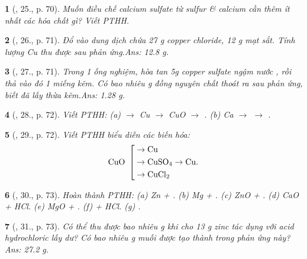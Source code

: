 \documentclass{article}
\newtheorem{baitoan}{}
\begin{document}
\begin{baitoan}[\cite{An_Hoa_Hoc_nang_cao_8_9}, 25., p. 70]
	Muốn điều chế calcium sulfate từ sulfur \& calcium cần thêm ít nhất các hóa chất gì? Viết {\rm PTHH}.
\end{baitoan}

\begin{baitoan}[\cite{An_Hoa_Hoc_nang_cao_8_9}, 26., p. 71]
	Đổ vào dung dịch chứa {\rm27 g} copper chloride, {\rm12 g} mạt sắt. Tính lượng {\rm Cu} thu được sau phản ứng.\hfill{\sf Ans: 12.8 g.}
\end{baitoan}

\begin{baitoan}[\cite{An_Hoa_Hoc_nang_cao_8_9}, 27., p. 71]
	Trong 1 ống nghiệm, hòa tan {\rm5g} copper sulfate ngậm nước {\rm{}}, rồi thả vào đó 1 miếng kẽm. Có bao nhiêu {\rm g} đồng nguyên chất thoát ra sau phản ứng, biết đã lấy thừa kẽm.\hfill{\sf Ans: 1.28 g.}
\end{baitoan}

\begin{baitoan}[\cite{An_Hoa_Hoc_nang_cao_8_9}, 28., p. 72]
	Viết {\rm PTHH}: (a) {\rm{} $\to$ Cu $\to$ CuO $\to$ }. (b) {\rm Ca $\to$  $\to$ }.
\end{baitoan}

\begin{baitoan}[\cite{An_Hoa_Hoc_nang_cao_8_9}, 29., p. 72]
	Viết {\rm PTHH} biểu diễn các biến hóa: 
	\begin{equation*}
		{\rm CuO}\ \left[\begin{split}
			&\to{\rm Cu}\\
			&\to\ce{CuSO4}\to{\rm Cu}.\\
			&\to\ce{CuCl2}
		\end{split}\right.
	\end{equation*}
\end{baitoan}

\begin{baitoan}[\cite{An_Hoa_Hoc_nang_cao_8_9}, 30., p. 73]
	Hoàn thành {\rm PTHH}: (a) {\rm Zn + }. (b) {\rm Mg + }. (c) {\rm ZnO + }. (d) {\rm CaO + HCl}. (e) {\rm MgO + }. (f) {\rm{} + HCl}. (g) {\rm{}}.
\end{baitoan}

\begin{baitoan}[\cite{An_Hoa_Hoc_nang_cao_8_9}, 31., p. 73]
	Có thể thu được bao nhiêu {\rm g } khi cho {\rm13 g} zinc tác dụng với acid hydrochloric lấy dư? Có bao nhiêu {\rm g} muối được tạo thành trong phản ứng này?\hfill{\sf Ans: 27.2 g.}
\end{baitoan}
\end{document}
